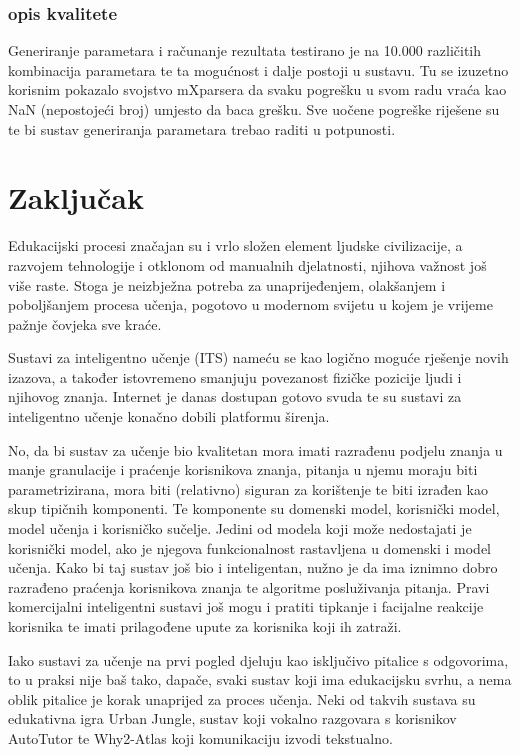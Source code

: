 \documentclass[times, utf8, zavrsni, numeric]{fer}
\begin{document}
\subsection{opis kvalitete}
Generiranje parametara i računanje rezultata testirano je na 10.000 različitih kombinacija parametara te ta mogućnost i dalje postoji u sustavu. Tu se izuzetno korisnim pokazalo svojstvo mXparsera da svaku pogrešku u svom radu vraća kao NaN (nepostojeći broj) umjesto da baca grešku. Sve uočene pogreške riješene su te bi sustav generiranja parametara trebao raditi u potpunosti.

\chapter{Zaključak}
Edukacijski procesi značajan su i vrlo složen element ljudske civilizacije, a razvojem tehnologije i otklonom od manualnih djelatnosti, njihova važnost još više raste. Stoga je neizbježna potreba za unaprijeđenjem, olakšanjem i poboljšanjem procesa učenja, pogotovo u modernom svijetu u kojem je vrijeme pažnje čovjeka sve kraće.
\par
Sustavi za inteligentno učenje (ITS) nameću se kao logično moguće rješenje novih izazova, a također istovremeno smanjuju povezanost fizičke pozicije ljudi i njihovog znanja. Internet je danas dostupan gotovo svuda te su sustavi za inteligentno učenje konačno dobili platformu širenja.
\par 
No, da bi sustav za učenje bio kvalitetan mora imati razrađenu podjelu znanja u manje granulacije i praćenje korisnikova znanja, pitanja u njemu moraju biti parametrizirana, mora biti (relativno) siguran za korištenje te biti izrađen kao skup tipičnih komponenti. Te komponente su domenski model, korisnički model, model učenja i korisničko sučelje. Jedini od modela koji može nedostajati je korisnički model, ako je njegova funkcionalnost rastavljena u domenski i model učenja. Kako bi taj sustav još bio i inteligentan, nužno je da ima iznimno dobro razrađeno praćenja korisnikova znanja te algoritme posluživanja pitanja. Pravi  komercijalni inteligentni sustavi još mogu i pratiti tipkanje i facijalne reakcije korisnika te imati prilagođene upute za korisnika koji ih zatraži.
\par
Iako sustavi za učenje na prvi pogled djeluju kao isključivo pitalice s odgovorima, to u praksi nije baš tako, dapače, svaki sustav koji ima edukacijsku svrhu, a nema oblik pitalice je korak unaprijed za proces učenja. Neki od takvih sustava su edukativna igra Urban Jungle, sustav koji vokalno razgovara s korisnikov AutoTutor te Why2-Atlas koji komunikaciju izvodi tekstualno.
\end{document}
